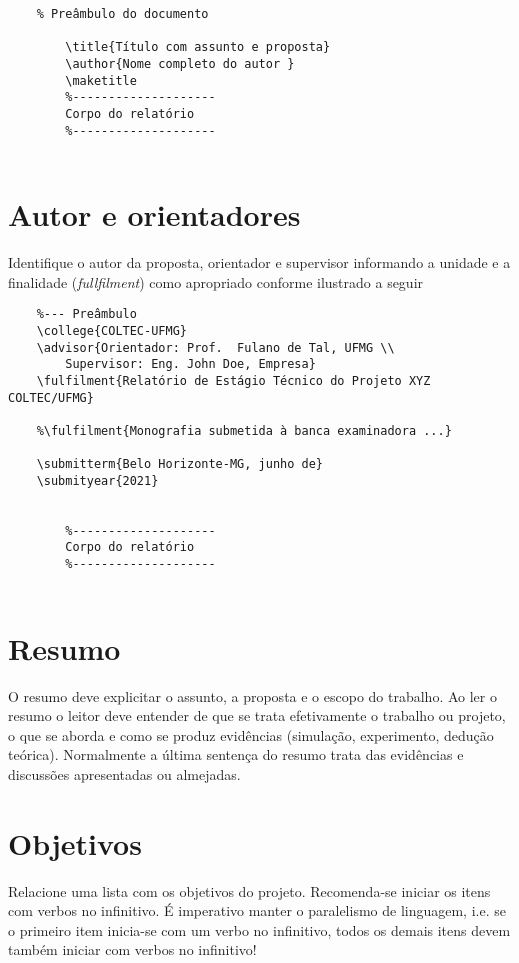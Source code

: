 \lstset{language=[Latex]Tex, frame = single, framexleftmargin=15pt}
\begin{lstlisting}
	% Preâmbulo do documento
	
		\title{Título com assunto e proposta}
		\author{Nome completo do autor }
		\maketitle
		%--------------------
		Corpo do relatório
		%--------------------
	
\end{lstlisting}

\section{Autor e orientadores}
Identifique o autor da proposta, orientador e supervisor informando a unidade e a finalidade (\emph{fullfilment}) como apropriado conforme ilustrado a seguir

\begin{lstlisting}
	%--- Preâmbulo
	\college{COLTEC-UFMG}  
	\advisor{Orientador: Prof.  Fulano de Tal, UFMG \\
		Supervisor: Eng. John Doe, Empresa}
	\fulfilment{Relatório de Estágio Técnico do Projeto XYZ COLTEC/UFMG} 
	
	%\fulfilment{Monografia submetida à banca examinadora ...} 
	
	\submitterm{Belo Horizonte-MG, junho de}
	\submityear{2021}
	
	
		%--------------------
		Corpo do relatório
		%--------------------
	
\end{lstlisting}


\section{Resumo}
O resumo deve explicitar o assunto, a proposta e o escopo do trabalho.
Ao ler o resumo o leitor deve entender de que se trata efetivamente o
trabalho ou projeto, o que se aborda e como se produz evidências
(simulação, experimento, dedução teórica). Normalmente a última sentença
do resumo trata das evidências e discussões apresentadas ou almejadas.


\section{Objetivos}
Relacione uma lista com os objetivos do projeto. Recomenda-se iniciar os itens com
verbos no infinitivo. É imperativo manter o paralelismo de linguagem,
i.e. se o primeiro item inicia-se com um verbo no infinitivo, todos os
demais itens devem também iniciar com verbos no infinitivo!

